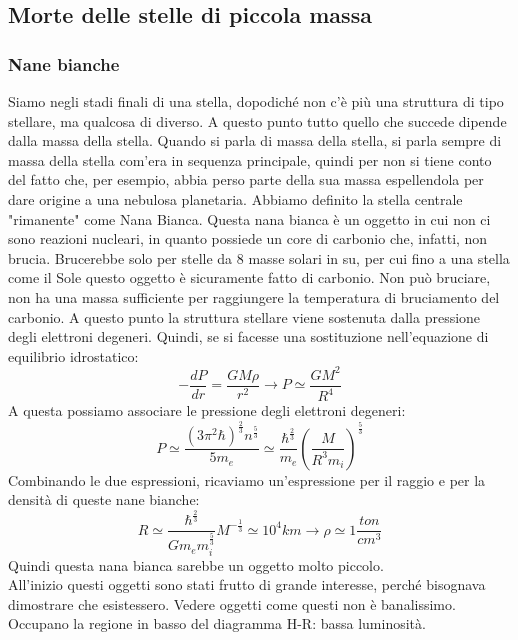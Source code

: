 \documentclass[a4paper,11pt]{article}
\begin{document}
    \newpage
\subsection{Morte delle stelle di piccola massa}
   \subsubsection{Nane bianche}
   Siamo negli stadi finali di una stella, dopodiché non c'è più una struttura di tipo stellare, ma qualcosa di diverso. A questo punto tutto quello che succede dipende dalla massa della stella. Quando si parla di massa della stella, si parla sempre di massa della stella com'era in sequenza principale, quindi per non si tiene conto del fatto che, per esempio, abbia perso parte della sua massa espellendola per dare origine a una nebulosa planetaria. Abbiamo definito la stella centrale "rimanente" come Nana Bianca. Questa nana bianca è un oggetto in cui non ci sono reazioni nucleari, in quanto possiede un core di carbonio che, infatti, non brucia. Brucerebbe solo per stelle da 8 masse solari in su, per cui fino a una stella come il Sole questo oggetto è sicuramente fatto di carbonio. Non può bruciare, non ha una massa sufficiente per raggiungere la temperatura di bruciamento del carbonio. A questo punto la struttura stellare viene sostenuta dalla pressione degli elettroni degeneri. Quindi, se si facesse una sostituzione nell'equazione di equilibrio idrostatico:
$$
-\frac{dP}{dr}=\frac{GM\rho}{r^{2}} \rightarrow P \simeq \frac{GM^{2}}{R^{4}}
$$
A questa possiamo associare le pressione degli elettroni degeneri:
$$
P\simeq \frac{(3\pi^{2}\hbar)^{\frac{2}{3}}n^{\frac{5}{3}}}{5m_e} \simeq \frac{\hbar^{\frac{2}{3}}}{m_e}(\frac{M}{R^{3}m_i})^{\frac{5}{3}}
$$
Combinando le due espressioni, ricaviamo un'espressione per il raggio e per la densità di queste nane bianche:\\
$$
R \simeq \frac{\hbar^{\frac{2}{3}}}{Gm_{e}m_{i}^{\frac{5}{3}}} M^{-\frac{1}{3}} \simeq 10^{4} km \rightarrow \rho \simeq 1 \frac{ton}{cm^{3}}
$$
Quindi questa nana bianca sarebbe un oggetto molto piccolo. \\ All'inizio questi oggetti sono stati frutto di grande interesse, perché bisognava dimostrare che esistessero. Vedere oggetti come questi non è banalissimo. Occupano la regione in basso del diagramma H-R: bassa luminosità. \\
\end{document}
